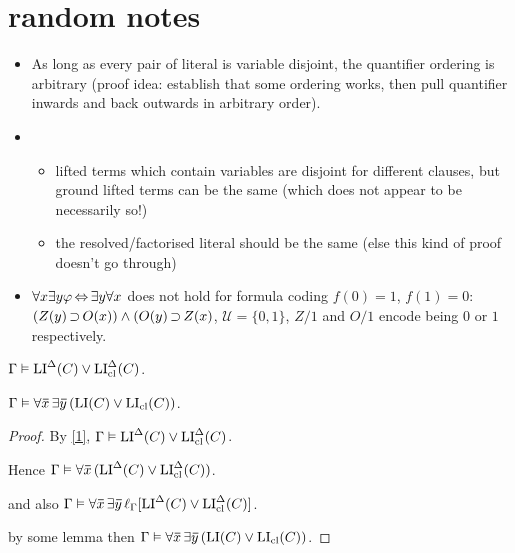 \documentclass[,%
	draft=false,%
	numbers=noendperiod
	11pt,
	a4paper,
	oneside,%
	openany,
]{memoir}
\begin{document}
\tableofcontents

\section{random notes}

\begin{itemize}
	\item As long as every pair of literal is variable disjoint, the quantifier ordering is arbitrary (proof idea: establish that some ordering works, then pull quantifier inwards and back outwards in arbitrary order).
	\item

		\begin{itemize}
			\item lifted terms which contain variables are disjoint for different clauses,
				but ground lifted terms can be the same (which does not appear to be necessarily so!)
			\item  the resolved/factorised literal should be the same (else this kind of proof doesn't go through)
		\end{itemize}
	\item $\forall x \exists y \varphi \operatorname{\Leftrightarrow} \exists y \forall x  $ does not hold for formula coding $f(0) = 1$, $f(1) = 0$: $(Z(y) \operatorname{\supset} O(x))\land (O(y) \operatorname{\supset} Z(x)$, $\mathcal{U} = \{ 0, 1\}$, $Z/1$ and $O/1$ encode being $0$ or $1$ respectively.
\end{itemize}


\begin{lemma}
	\label{1}
	$\Gamma \vDash \operatorname{LI}^\Delta(C) \lor \operatorname{LI}_{\operatorname{cl}}^\Delta(C)$.
\end{lemma}

\begin{lemma}
	\label{2}
	$\Gamma \vDash \forall \bm\bar x\,\exists \bm\bar y\,(\operatorname{LI}(C) \lor \operatorname{LI}_{\operatorname{cl}}(C))$.
\end{lemma}
\begin{proof}
	By \ref{1}, 
	$\Gamma \vDash \operatorname{LI}^\Delta(C) \lor \operatorname{LI}_{\operatorname{cl}}^\Delta(C)$.

	Hence 
	$\Gamma \vDash \forall \bm\bar x\,( \operatorname{LI}^\Delta(C) \lor \operatorname{LI}_{\operatorname{cl}}^\Delta(C))$.

	and also 
	$\Gamma \vDash \forall \bm\bar x\,\exists \bm\bar y\,\ell_{\Gamma}[ \operatorname{LI}^\Delta(C) \lor \operatorname{LI}_{\operatorname{cl}}^\Delta(C)]$.

	by some lemma then
	$\Gamma \vDash \forall \bm\bar x\,\exists \bm\bar y\,(\operatorname{LI}(C) \lor \operatorname{LI}_{\operatorname{cl}}(C))$.
\end{proof}
\end{document}
